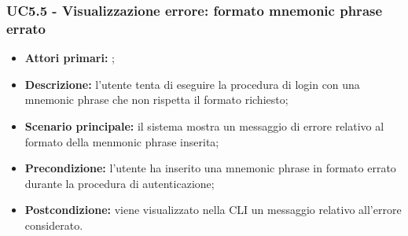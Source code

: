 \subsubsection{UC5.5 - Visualizzazione errore: formato mnemonic phrase errato}
\begin{itemize}
	\item \textbf{Attori primari:} \una{};
	\item \textbf{Descrizione:} l’utente tenta di eseguire la procedura di login con una mnemonic phrase che non rispetta il formato richiesto;  
	\item \textbf{Scenario principale:} il sistema mostra un messaggio di errore relativo al formato della menmonic phrase inserita;
	\item \textbf{Precondizione:} l'utente ha inserito una mnemonic phrase in formato errato durante la procedura di autenticazione; 
	\item \textbf{Postcondizione:} viene visualizzato nella CLI un messaggio relativo all’errore considerato.  
\end{itemize}